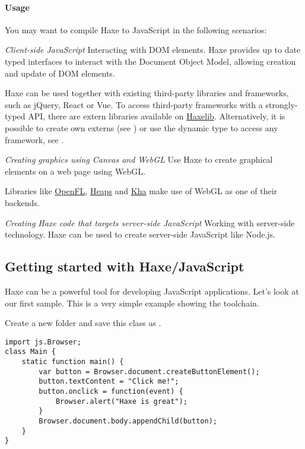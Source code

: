 \paragraph{Usage}

You may want to compile Haxe to JavaScript in the following scenarios:

\emph{Client-side JavaScript}
Interacting with DOM elements. Haxe provides up to date typed interfaces to interact with the Document Object Model, allowing creation and update of DOM elements. 

Haxe can be used together with existing third-party libraries and frameworks, such as jQuery, React or Vue. To access third-party frameworks with a strongly-typed API, there are extern libraries available on \href{http://lib.haxe.org/t/js/}{Haxelib}. Alternatively, it is possible to create own externs (see ) or use the dynamic type to access any framework, see .

\emph{Creating graphics using Canvas and WebGL}
Use Haxe to create graphical elements on a web page using WebGL. 

Libraries like \href{http://www.openfl.org/}{OpenFL}, \href{http://heaps.io/}{Heaps} and \href{http://kha.tech/}{Kha} make use of WebGL as one of their backends.

\emph{Creating Haxe code that targets server-side JavaScript}
Working with server-side technology. Haxe can be used to create server-side JavaScript like Node.js.


\subsection{Getting started with Haxe/JavaScript}
\label{target-javascript-getting-started}

Haxe can be a powerful tool for developing JavaScript applications. Let's look at our first sample.
This is a very simple example showing the toolchain. 

Create a new folder and save this class as .

\begin{lstlisting}
import js.Browser;
class Main {
    static function main() {
        var button = Browser.document.createButtonElement();
        button.textContent = "Click me!";
        button.onclick = function(event) {
            Browser.alert("Haxe is great");
        }
        Browser.document.body.appendChild(button);
    }
}
\end{lstlisting}

